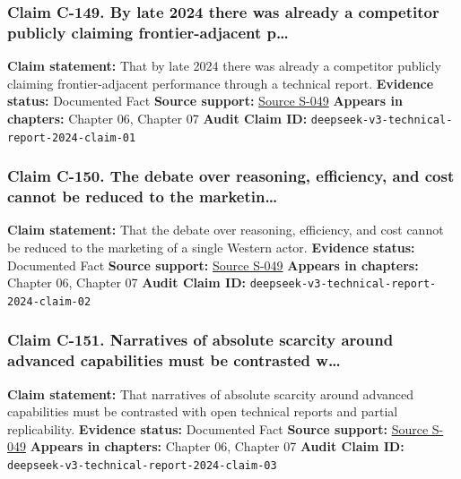 \documentclass[
  american,
  11pt,
  letterpaper,
]{article}
\begin{document}
\subsubsection{Claim C-149. By late 2024 there was already a competitor
publicly claiming frontier-adjacent
p\ldots{}}\label{claim-c-149-by-late-2024-there-was-already-a-competitor-publicly-claiming-frontier-adjacent-p}

\textbf{Claim statement:} That by late 2024 there was already a
competitor publicly claiming frontier-adjacent performance through a
technical report. \textbf{Evidence status:} Documented Fact
\textbf{Source support:}
\hyperref[source-s-049-deepseek-v3-technical-report]{Source S-049}
\textbf{Appears in chapters:} Chapter 06, Chapter 07 \textbf{Audit Claim
ID:} \texttt{deepseek-v3-technical-report-2024-claim-01}

\subsubsection{Claim C-150. The debate over reasoning, efficiency, and
cost cannot be reduced to the
marketin\ldots{}}\label{claim-c-150-the-debate-over-reasoning-efficiency-and-cost-cannot-be-reduced-to-the-marketin}

\textbf{Claim statement:} That the debate over reasoning, efficiency,
and cost cannot be reduced to the marketing of a single Western actor.
\textbf{Evidence status:} Documented Fact \textbf{Source support:}
\hyperref[source-s-049-deepseek-v3-technical-report]{Source S-049}
\textbf{Appears in chapters:} Chapter 06, Chapter 07 \textbf{Audit Claim
ID:} \texttt{deepseek-v3-technical-report-2024-claim-02}

\subsubsection{Claim C-151. Narratives of absolute scarcity around
advanced capabilities must be contrasted
w\ldots{}}\label{claim-c-151-narratives-of-absolute-scarcity-around-advanced-capabilities-must-be-contrasted-w}

\textbf{Claim statement:} That narratives of absolute scarcity around
advanced capabilities must be contrasted with open technical reports and
partial replicability. \textbf{Evidence status:} Documented Fact
\textbf{Source support:}
\hyperref[source-s-049-deepseek-v3-technical-report]{Source S-049}
\textbf{Appears in chapters:} Chapter 06, Chapter 07 \textbf{Audit Claim
ID:} \texttt{deepseek-v3-technical-report-2024-claim-03}
\end{document}

